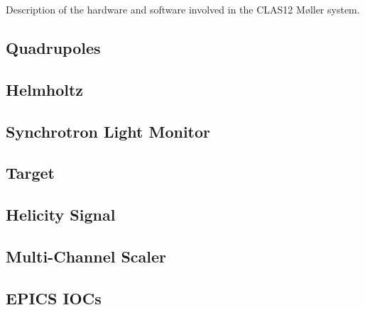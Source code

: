 \documentclass[amsmath,amssymb,notitlepage,11pt]{revtex4}
\begin{document}
\newpage
\begin{appendices}
Description of the hardware and software involved in the CLAS12 M{\o}ller system.
\subsection{Quadrupoles}
\subsection{Helmholtz}
\subsection{Synchrotron Light Monitor}
\subsection{Target}
\subsection{Helicity Signal}
\subsection{Multi-Channel Scaler}
\subsection{EPICS IOCs}
\end{appendices}
\end{document}
